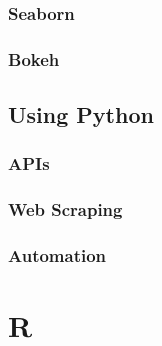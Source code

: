 \documentclass[
]{book}
\begin{document}
\hypertarget{seaborn}{%
\subsection{Seaborn}\label{seaborn}}

\hypertarget{bokeh}{%
\subsection{Bokeh}\label{bokeh}}

\hypertarget{using-python}{%
\section{Using Python}\label{using-python}}

\hypertarget{apis}{%
\subsection{APIs}\label{apis}}

\hypertarget{web-scraping}{%
\subsection{Web Scraping}\label{web-scraping}}

\hypertarget{automation}{%
\subsection{Automation}\label{automation}}

\hypertarget{r}{%
\chapter{R}\label{r}}

  
\end{document}
